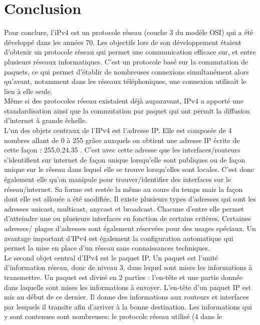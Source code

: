 
\section{Conclusion}

Pour conclure, l'iPv4 est un protocole réseau (couche 3 du modèle OSI) qui
 a été développé dans les années 70. Les objectifs lors de son développement 
étaient d'obtenir un protocole réseau qui permet une communication efficace sur, et entre 
plusieurs réseaux informatiques. C'est un protocole basé sur la commutation de paquets, ce 
qui permet d'établir de nombreuses connexions simultanément alors qu'avant, notamment dans les réseaux téléphoniques, une connexion utilisait le lien à elle seule. 
\\
Même si des protocoles réseau existaient déjà auparavant, IPv4 a apporté une standardisation ainsi
que la commutation par paquet qui ont permit la diffusion d'internet à grande échelle.
\\
L'un des objets centraux de l'IPv4 est l'adresse IP. Elle est composée de 4 nombres allant de 0 à 255 
grâce auxquels on obtient une adresse IP écrite de cette façon : 255.0.24.35 .
C'est avec cette adresse que les interfaces/routeurs s'identifient sur internet de façon unique 
lorsqu'elle sont publiques ou de façon unique sur le réseau dans lequel elle se trouve lorsqu'elles sont locales. 
C'est donc également elle qu'on manipule pour trouver/identifier des interfaces sur le réseau/internet.
 Sa forme est restée la même au cours du temps mais la façon dont elle est allouée a été modifiée.
Il existe plusieurs types d'adresses qui sont les adresses unicast, multicast, anycast et broadcast.
 Chacune d'entre elle permet d'atteindre une ou plusieurs interfaces en fonction de certains
critères. Certaines adresses/ plages d'adresses sont également réservées pour des usages spéciaux. 
Un avantage important d'IPv4 est également la configuration automatique qui permet la mise 
en place d'un réseau sans connaissances techniques.
\\
Le second objet central d'IPv4 est le paquet IP. Un paquet est l'unité d'information réseau, donc 
de niveau 3, dans lequel sont mises les informations à transmettre. Un paquet est divisé en 2 
parties : l'en-tête et une partie donnée dans laquelle sont mises les informations à envoyer.
 L'en-tête d'un paquet IP est mis au début de ce dernier. Il donne des informations aux 
routeurs et interfaces par lesquels il transite afin d'arriver à la bonne destination. Les
 informations qui y sont contenues sont nombreuses: le protocole réseau utilisé (4 dans le
